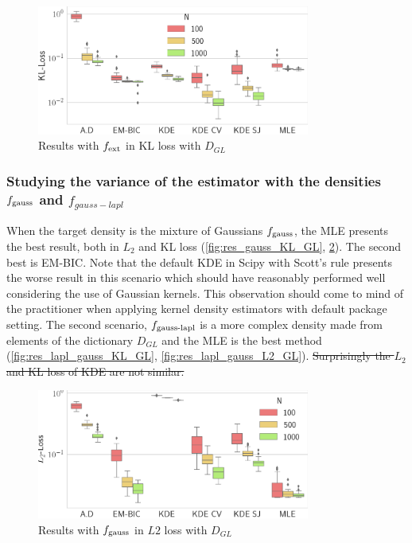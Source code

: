 \begin{figure}
\center
    \includegraphics[width=0.8\textwidth]{./TeX_files/res_lapl_gauss_not_dict_KL_GL.png}
    \caption{Results with $f_{\textnormal{ext}}$ in KL loss with $D_{GL}$}
    \label{fig:res_ext_KL_GL}
\end{figure}
\subsubsection{Studying the variance of the estimator with the densities $f_{\textnormal{gauss}}$ and $f_{gauss-lapl}$}
When the target density is the mixture of Gaussians $f_{\textnormal{gauss}}$, the MLE presents the best result, both in $L_2$ and KL loss (\cref{fig:res_gauss_KL_GL}, \cref{fig:res_gauss_L2_GL}). The second best is EM-BIC. Note that the default KDE in Scipy\citep{scipy} with Scott's rule presents the worse result in this scenario which should have reasonably performed well considering the use of Gaussian kernels. This observation should come to mind of the practitioner when applying kernel density estimators with default package setting. The second scenario, $f_{\textnormal{gauss-lapl}}$ is a more complex density made from elements of the dictionary $D_{GL}$ and the MLE is the best method (\cref{fig:res_lapl_gauss_KL_GL}, \cref{fig:res_lapl_gauss_L2_GL}). \sout{Surprisingly the $L_2$ and KL loss of KDE are not similar.}
\begin{figure}
\center
    \includegraphics[width=0.8\textwidth]{./TeX_files/res_gauss_L2_GL.png}
    \caption{Results with $f_{\textnormal{gauss}}$ in $L2$ loss with $D_{GL}$}
    \label{fig:res_gauss_L2_GL}
\end{figure}
